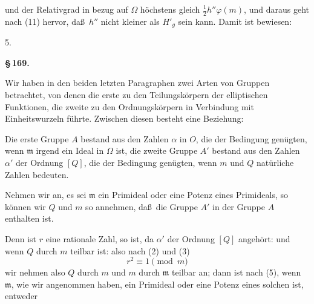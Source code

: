 
und der Relativgrad in bezug auf $\Omega$ h\"ochstens gleich $\tfrac{1}{2} h''\varphi(m)$, und daraus geht nach (11) hervor, da\ss\ $h''$ nicht kleiner als $H'_g$ sein kann. Damit ist bewiesen:

5. 

\noindent\textbf{\S\,169.\qquad {}}

Wir haben in den beiden letzten Paragraphen zwei Arten von Gruppen betrachtet, von denen die erste zu den Teilungsk\"orpern der elliptischen Funktionen, die zweite zu den Ordnungsk\"orpern in Verbindung mit Einheitswurzeln f\"uhrte. Zwischen diesen besteht eine Beziehung:

Die erste Gruppe $A$ bestand aus den Zahlen $\alpha$ in $O$, die der Bedingung
gen\"ugten, wenn $\mathfrak{m}$ irgend ein Ideal in $\Omega$ ist, die zweite Gruppe $A'$ bestand aus den Zahlen $\alpha'$ der Ordnung $[Q]$, die der Bedingung
gen\"ugten, wenn $m$ und $Q$ nat\"urliche Zahlen bedeuten.

Nehmen wir an, es sei $\mathfrak{m}$ ein Primideal oder eine Potenz eines Primideals, so k\"onnen wir $Q$ und $m$ so annehmen, da\ss\ die Gruppe $A'$ in der Gruppe $A$ enthalten ist.

Denn ist $r$ eine rationale Zahl, so ist, da $\alpha'$ der Ordnung $[Q]$ angeh\"ort:
und wenn $Q$ durch $m$ teilbar ist:
also nach (2) und (3)
\[
r^2 \equiv 1 \pmod{m}
\]
wir nehmen also $Q$ durch $m$ und $m$ durch $\mathfrak{m}$ teilbar an; dann ist nach (5), wenn $\mathfrak{m}$, wie wir angenommen haben, ein Primideal oder eine Potenz eines solchen ist, entweder
